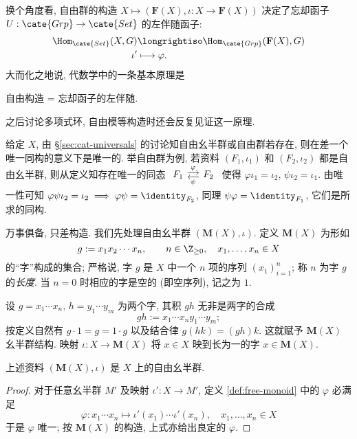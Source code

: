 \begin{remark}
	换个角度看, 自由群的构造 $X \mapsto (\mathbf{F}(X), \iota: X \to \mathbf{F}(X))$ 决定了忘却函子 $U: \cate{Grp} \to \cate{Set}$ 的左伴随函子:
	\begin{align*}
		\Hom_\cate{Set}(X, G) & \longrightiso \Hom_\cate{Grp}(\mathbf{F}(X), G) \\
		\iota' & \longmapsto \varphi.
	\end{align*}
	大而化之地说, 代数学中的一条基本原理是
	\begin{center}
		自由构造 = 忘却函子的左伴随.
	\end{center}
	之后讨论多项式环, 自由模等构造时还会反复见证这一原理.
\end{remark}
给定 $X$, 由 \S\ref{sec:cat-universals} 的讨论知自由幺半群或自由群若存在, 则在差一个唯一同构的意义下是唯一的. 举自由群为例, 若资料 $(F_1, \iota_1)$ 和 $(F_2, \iota_2)$ 都是自由幺半群, 则从定义知存在唯一的同态 $\begin{tikzcd}[column sep=small] F_1 \arrow[r, yshift=0.5ex, "\varphi"] & F_2 \arrow[l, yshift=-0.5ex, "\psi"] \end{tikzcd}$ 使得 $\varphi \iota_1 =\iota_2$, $\psi \iota_2 = \iota_1$. 由唯一性可知 $ \varphi\psi \iota_2 = \iota_2 \implies \varphi\psi = \identity_{F_2}$, 同理 $\psi\varphi = \identity_{F_1}$, 它们是所求的同构.

万事俱备, 只差构造. 我们先处理自由幺半群 $(\mathbf{M}(X), \iota)$. 定义 $\mathbf{M}(X)$ 为形如
\[ g := x_1 x_2  \cdots x_n, \qquad n \in \Z_{\geq 0}, \quad x_1, \ldots, x_n \in X \]
的``字''构成的集合; 严格说, 字 $g$ 是 $X$ 中一个 $n$ 项的序列 $(x_1)_{i=1}^n$; 称 $n$ 为字 $g$ 的\emph{长度}. 当 $n=0$ 时相应的字是空的 (即空序列), 记之为 $1$.

设 $g = x_1 \cdots x_n$, $h = y_1 \cdots y_m$ 为两个字, 其积 $gh$ 无非是两字的合成
\[ gh := x_1 \cdots x_n y_1 \cdots y_m; \]
按定义自然有 $g \cdot 1 = g = 1 \cdot g$ 以及结合律 $g(hk) = (gh)k$. 这就赋予 $\mathbf{M}(X)$ 幺半群结构. 映射 $\iota: X \to \mathbf{M}(X)$ 将 $x \in X$ 映到长为一的字 $x \in \mathbf{M}(X)$.

\begin{lemma}
	上述资料 $(\mathbf{M}(X), \iota)$ 是 $X$ 上的自由幺半群.
\end{lemma}
\begin{proof}
	对于任意幺半群 $M'$ 及映射 $\iota': X \to M'$, 定义 \ref{def:free-monoid} 中的 $\varphi$ 必满足
	\[ \varphi: x_1 \cdots x_n \longmapsto \iota'(x_1) \cdots \iota'(x_n), \quad x_1, \ldots, x_n \in X \]
	于是 $\varphi$ 唯一; 按 $\mathbf{M}(X)$ 的构造, 上式亦给出良定的 $\varphi$.
\end{proof}

